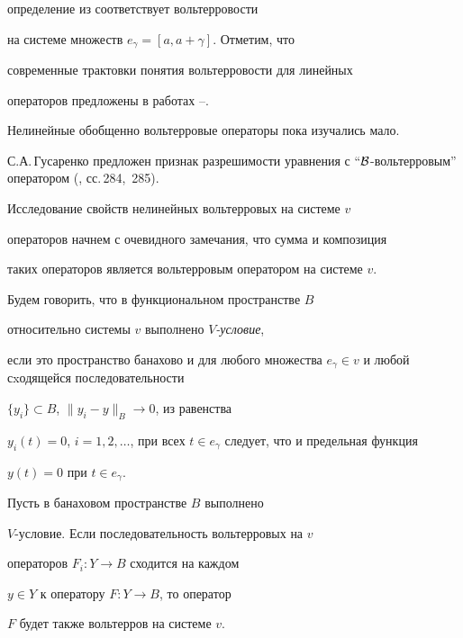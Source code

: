 определение из \cite{Tix1} соответствует вольтерровости


на системе множеств $e_{\gamma}=[a, a+\gamma]$. Отметим, что


современные трактовки понятия вольтерровости для линейных


операторов предложены в работах \cite{Brod}--\cite{Sum2}.


Нелинейные обобщенно вольтерровые операторы пока изучались мало.


С.А.\,Гусаренко предложен признак разрешимости уравнения с ``${\cal


B}$-вольтерровым'' оператором (\cite{AzbMakRahFDU2}, сс.\,284,~285).





Исследование свойств нелинейных вольтерровых на системе $v$


операторов начнем с очевидного замечания, что сумма и композиция


таких операторов является вольтерровым оператором на системе $v$.





Будем говорить, что в функциональном пространстве $B$


относительно системы $v$ выполнено $V${\it -условие},


если это пространство банахово и для любого множества $e_{\gamma}


\in v$ и любой сxодящейся последовательности


$\{y_{i}\}\subset B$, $\|y_{i}-y\|_{B} \to 0$, из равенства


$y_{i}(t)=0$, $i=1, 2,\dotsc$, при всех $t \in


e_{\gamma}$ следует, что и предельная функция


$y (t)=0 $ при $t \in e_{\gamma}$.








\begin{thm}


Пусть в банаховом пространстве $B$ выполнено


$V$-условие. Если последовательность вольтерровых на $v$


операторов $F_{i}:Y \to B$ сходится на каждом


$y \in Y$ к оператору $F:Y \to B$, то оператор


$F$ будет также вольтерров на системе $v$.


\end{thm}









